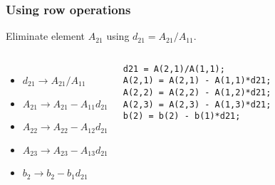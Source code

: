 \begin{frame}[fragile]
  \frametitle{Using row operations}
  Eliminate element $A_{21}$ using $d_{21}=A_{21}/A_{11}$.
  \vfill
  \vfill\pause
  \begin{columns}
  \begin{itemize}
    \item $d_{21}\rightarrow A_{21}/A_{11}$
    \item $A_{21}\rightarrow A_{21}-A_{11}d_{21}$
    \item $A_{22}\rightarrow A_{22}-A_{12}d_{21}$
    \item $A_{23}\rightarrow A_{23}-A_{13}d_{21}$
    \item $b_2   \rightarrow b_2   -b_1   d_{21}$
  \end{itemize}
  \pause
   \begin{lstlisting}
d21 = A(2,1)/A(1,1);
A(2,1) = A(2,1) - A(1,1)*d21;
A(2,2) = A(2,2) - A(1,2)*d21;
A(2,3) = A(2,3) - A(1,3)*d21;
b(2) = b(2) - b(1)*d21;
   \end{lstlisting}
  \end{columns}
\end{frame}

